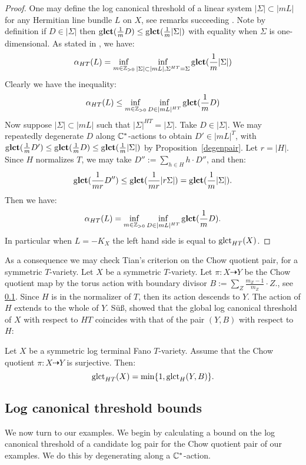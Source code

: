 \begin{proof}
One may define the log canonical threshold of a linear system \(|\Sigma| \subset |mL|\) for any Hermitian line bundle \(L\) on \(X\), see remarks succeeding \cite[Definition A.2]{cheltsov08}. Note by definition if \(D \in |\Sigma|\) then \(\operatorname{g\bf{lct}}(\frac{1}{m} D) \le \operatorname{g\bf{lct}}( \frac{1}{m} |\Sigma|)\) with equality when \(\Sigma\) is one-dimensional. As stated in \cite[(A.1)]{cheltsov08}, we have:
\[
\alpha_{HT}(L) = \inf_{m \in \mathbb{Z}_{>0}} \inf_{|\Sigma| \subset |mL|, \Sigma^{HT} = \Sigma} \operatorname{g\bf{lct}} ( \frac{1}{m} |\Sigma| ) 
\]
Clearly we have the inequality:
\[
\alpha_{HT}(L)  \le \inf_{m \in \mathbb{Z}_{>0}} \inf_{D \in |mL|^{HT}} \operatorname{g\bf{lct}} (\frac{1}{m} D) 
\]
Now suppose \(|\Sigma| \subset |mL|\) such that \(|\Sigma|^{HT} = |\Sigma|\). Take \(D \in |\Sigma|\). We may repeatedly degenerate \(D\) along \(\mathbb{C}^*\)-actions to obtain \(D' \in |mL|^{T}\), with \(\operatorname{g\bf{lct}}(\frac{1}{m}D') \le \operatorname{g\bf{lct}}(\frac{1}{m}D) \le \operatorname{g\bf{lct}}( \frac{1}{m}|\Sigma|)\) by Proposition~\ref{degenpair}. Let \(r = |H|\). Since \(H\) normalizes \(T\), we may take \(D'':= \sum_{h \in H} h \cdot D''\), and then:
\[
\operatorname{g\bf{lct}}(\frac{1}{m r }D'') \le \operatorname{g\bf{lct}}( \frac{1}{mr} | r\Sigma|) = \operatorname{g\bf{lct}}( \frac{1}{m}|\Sigma|).
\]
Then we have:
\[
\alpha_{HT}(L) = \inf_{m \in \mathbb{Z}_{>0}} \inf_{D \in |mL|^{HT}} \operatorname{g\bf{lct}} (\frac{1}{m} D).
\]
In particular when \(L = -K_X\) the left hand side is equal to \(\operatorname{glct}_{HT}(X)\).
\end{proof}
As a consequence we may check Tian's criterion on the Chow quotient pair, for a symmetric \(T\)-variety. Let \(X\) be a symmetric \(T\)-variety. Let \(\pi:X \dashrightarrow Y\) be the Chow quotient map by the torus action with boundary divisor \(B := \sum_Z \frac{m_Z-1}{m_Z} \cdot Z.\), see \ref{}. Since \(H\) is in the normalizer of \(T\), then its action descends to \(Y\). The action of \(H\) extends to the whole of \(Y\). S{\"u}{\ss}, showed that the global log canonical threshold of \(X\) with respect to \(HT\) coincides with that of the pair \((Y,B)\) with respect to \(H\):
\begin{theorem}[ {\cite[Theorem 1.2]{Su13}}]\label{thm:SU}
Let \(X\) be a symmetric log terminal Fano \(T\)-variety. Assume that the Chow quotient \(\pi:X \dashrightarrow Y\) is surjective. Then:
\[
\operatorname{glct}_{HT}(X) = \min \{1, \operatorname{glct}_H(Y,B) \}.
\]
\end{theorem}
%
%
%
%
%
%
%
%
%
%
%
%
%
%
%
%
%
%
\subsection{Log canonical threshold bounds}
We now turn to our examples. We begin by calculating a bound on the log canonical threshold of a candidate log pair for the Chow quotient pair of our examples. We do this by degenerating along a \(\mathbb{C}^*\)-action.

